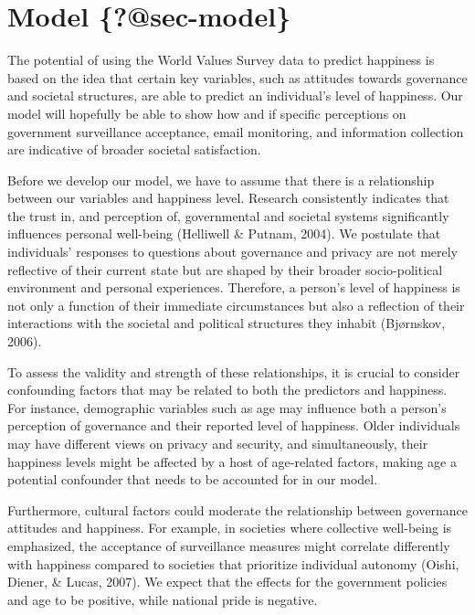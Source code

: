 \documentclass[
  letterpaper,
  DIV=11,
  numbers=noendperiod]{scrartcl}
\begin{document}
\hypertarget{model-sec-model}{%
\section{\texorpdfstring{Model
\{\textbf{?@sec-model}\}}{Model \{?@sec-model\}}}\label{model-sec-model}}

The potential of using the World Values Survey data to predict happiness
is based on the idea that certain key variables, such as attitudes
towards governance and societal structures, are able to predict an
individual's level of happiness. Our model will hopefully be able to
show how and if specific perceptions on government surveillance
acceptance, email monitoring, and information collection are indicative
of broader societal satisfaction.

Before we develop our model, we have to assume that there is a
relationship between our variables and happiness level. Research
consistently indicates that the trust in, and perception of,
governmental and societal systems significantly influences personal
well-being (Helliwell \& Putnam, 2004). We postulate that individuals'
responses to questions about governance and privacy are not merely
reflective of their current state but are shaped by their broader
socio-political environment and personal experiences. Therefore, a
person's level of happiness is not only a function of their immediate
circumstances but also a reflection of their interactions with the
societal and political structures they inhabit (Bjørnskov, 2006).

To assess the validity and strength of these relationships, it is
crucial to consider confounding factors that may be related to both the
predictors and happiness. For instance, demographic variables such as
age may influence both a person's perception of governance and their
reported level of happiness. Older individuals may have different views
on privacy and security, and simultaneously, their happiness levels
might be affected by a host of age-related factors, making age a
potential confounder that needs to be accounted for in our model.

Furthermore, cultural factors could moderate the relationship between
governance attitudes and happiness. For example, in societies where
collective well-being is emphasized, the acceptance of surveillance
measures might correlate differently with happiness compared to
societies that prioritize individual autonomy (Oishi, Diener, \& Lucas,
2007). We expect that the effects for the government policies and age to
be positive, while national pride is negative.
\end{document}
